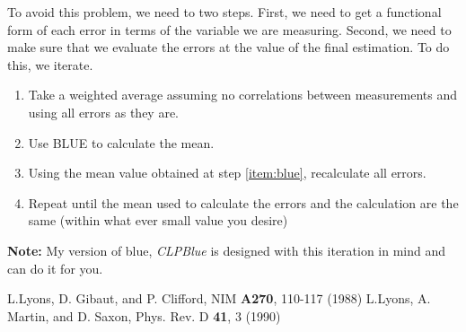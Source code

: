 \documentclass[12pt,twoside,letterpaper]{article}
\begin{document}
To avoid this problem, we need to two steps.  First, we need to get a
functional form of each error in terms of the variable we are
measuring.  Second, we need to make sure that we evaluate the errors
at the value of the final estimation.  To do this, we iterate.

\begin {enumerate}

  \item Take a weighted average assuming no correlations between
    measurements and using all errors as they are.

  \item \label{item:blue} Use BLUE to calculate the mean.

  \item Using the mean value obtained at step \ref{item:blue},
    recalculate all errors.

  \item Repeat until the mean used to calculate the errors and the
    calculation are the same (within what ever small value you desire)

\end {enumerate}

{\bf Note:} My version of blue, {\em CLPBlue} is designed with this
iteration in mind and can do it for you.


\begin{thebibliography}{}

 L.Lyons, D. Gibaut, and P. Clifford, NIM {\bf A270}, 110-117 (1988)
 L.Lyons, A. Martin, and D. Saxon, Phys. Rev. D {\bf 41}, 3 (1990)

\end{thebibliography}
\end{document}
